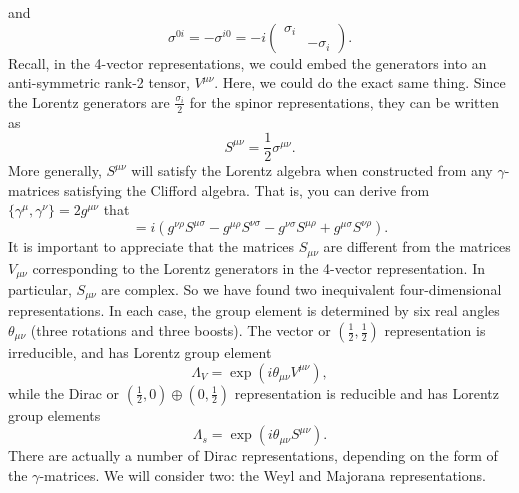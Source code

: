 \documentclass[11pt]{article}
\theoremstyle{definition}
\begin{document}
and
\begin{equation}
    \sigma^{0i} = -\sigma^{i0} = -i
    \begin{pmatrix}
        \sigma_i &\\
        & -\sigma_i
    \end{pmatrix}.
\end{equation}
Recall, in the 4-vector representations, we could embed the generators into an anti-symmetric rank-2 tensor, $V^{\mu\nu}$. Here, we could do the exact same thing. Since the Lorentz generators are $\frac{\sigma_i}{2}$ for the spinor representations, they can be written as 
\begin{equation}
    S^{\mu\nu} = \frac{1}{2}\sigma^{\mu\nu}.
\end{equation}
More generally, \(S^{\mu\nu}\) will satisfy the Lorentz algebra when constructed from any \(\gamma\)-matrices satisfying the Clifford algebra. That is, you can derive from \(\{\gamma^\mu,\gamma^\nu\} = 2g^{\mu\nu}\) that 
\begin{equation}
[S^{\mu\nu},S^{\rho\sigma}] = i(g^{\nu\rho}S^{\mu\sigma} - g^{\mu\rho}S^{\nu\sigma} - g^{\nu\sigma}S^{\mu\rho} + g^{\mu\sigma}S^{\nu\rho}).
\end{equation}
It is important to appreciate that the matrices \(S_{\mu\nu}\) are different from the matrices \(V_{\mu\nu}\) corresponding to the Lorentz generators in the 4-vector representation. In particular, \(S_{\mu\nu}\) are complex. So we have found two inequivalent four-dimensional representations. In each case, the group element is determined by six real angles \(\theta_{\mu\nu}\) (three rotations and three boosts). The vector or \((\frac{1}{2},\frac{1}{2})\) representation is irreducible, and has Lorentz group element
\begin{equation}
\Lambda_V = \exp(i\theta_{\mu\nu}V^{\mu\nu}),
\end{equation}
while the Dirac or \((\frac{1}{2},0)\oplus(0,\frac{1}{2})\) representation is reducible and has Lorentz group elements
\begin{equation}
\Lambda_s = \exp(i\theta_{\mu\nu}S^{\mu\nu}).
\end{equation}
There are actually a number of Dirac representations, depending on the form of the \(\gamma\)-matrices. We will consider two: the Weyl and Majorana representations.
\end{document}
